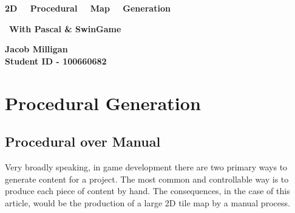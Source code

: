 \documentclass{article}
\begin{document}
\begin{titlepage}
\pagecolor{palegreen}
\centering
\vspace*{0.3cm}

\Huge
\begin{mdframed}[
	backgroundcolor=graymetal,
	linecolor=black,
	rightline=false,
	leftline=false,
	linewidth=4pt,
	innertopmargin=1.75cm,
	innerbottommargin=1.75cm
]
\centering

\textbf{2D \ \ Procedural \ \ Map \ \ Generation} 

\huge
\vfill
\
\textbf{With Pascal \& SwinGame}
\end{mdframed}

\vfill


\vfill
\large
\textbf{Jacob Milligan \\ \small Student ID - 100660682}

\end{titlepage}
\clearpage
\nopagecolor
\hypersetup{linkcolor=navyblue}
\tableofcontents
\hypersetup{linkcolor=blue}

\clearpage

\section{Procedural Generation}

\subsection{Procedural over Manual}


Very broadly speaking, in game development there are two primary ways to generate content for a project. The most common and controllable way is to produce each piece of content by hand. The consequences, in the case of this article, would be the production of a large 2D tile map by a manual process.
		
\end{document}

